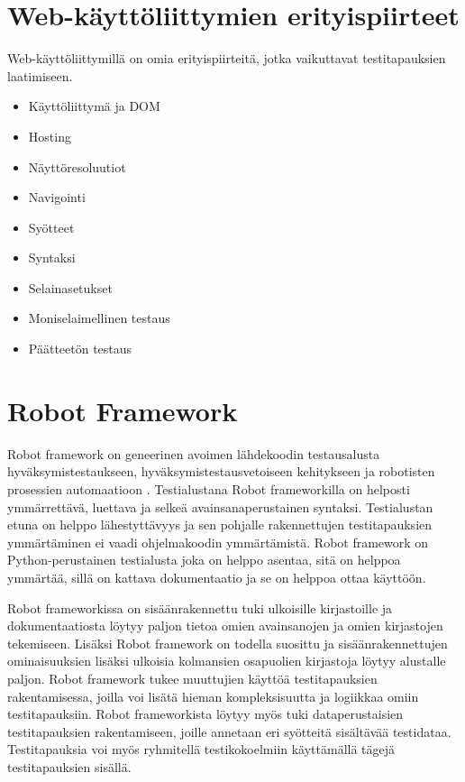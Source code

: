 \section{Web-käyttöliittymien erityispiirteet} \label{ch:08_webkayttoliittymien_erityispiirteet}

  Web-käyttöliittymillä on omia erityispiirteitä, jotka vaikuttavat testitapauksien laatimiseen.

  \begin{itemize}
    \item Käyttöliittymä ja DOM
    \item Hosting
    \item Näyttöresoluutiot
    \item Navigointi
    \item Syötteet
    \item Syntaksi
    \item Selainasetukset
    \item Moniselaimellinen testaus
    \item Päätteetön testaus
  \end{itemize}

\section{Robot Framework} \label{ch:08_robot_framework}

  Robot framework on geneerinen avoimen lähdekoodin testausalusta hyväksymistestaukseen, hyväksymistestausvetoiseen kehitykseen ja robotisten prosessien automaatioon \parencite{noauthor_robot_nodate}.
  Testialustana Robot frameworkilla on helposti ymmärrettävä, luettava ja selkeä avainsanaperustainen syntaksi.
  Testialustan etuna on helppo lähestyttävyys ja sen pohjalle rakennettujen testitapauksien ymmärtäminen ei vaadi ohjelmakoodin ymmärtämistä.
  Robot framework on Python-perustainen testialusta joka on helppo asentaa, sitä on helppoa ymmärtää, sillä on kattava dokumentaatio ja se on helppoa ottaa käyttöön.

  Robot frameworkissa on sisäänrakennettu tuki ulkoisille kirjastoille ja dokumentaatiosta löytyy paljon tietoa omien avainsanojen ja omien kirjastojen tekemiseen.
  Lisäksi Robot framework on todella suosittu ja sisäänrakennettujen ominaisuuksien lisäksi ulkoisia kolmansien osapuolien kirjastoja löytyy alustalle paljon.
  Robot framework tukee muuttujien käyttöä testitapauksien rakentamisessa, joilla voi lisätä hieman kompleksisuutta ja logiikkaa omiin testitapauksiin.
  Robot frameworkista löytyy myös tuki dataperustaisien testitapauksien rakentamiseen, joille annetaan eri syötteitä sisältävää testidataa.
  Testitapauksia voi myös ryhmitellä testikokoelmiin käyttämällä tägejä testitapauksien sisällä.


